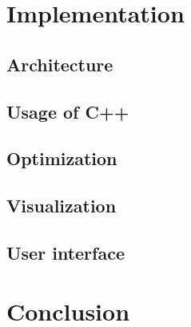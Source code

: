 \chapter{Implementation}

\section{Architecture}

\section{Usage of C++}

\section{Optimization}

\section{Visualization}

\section{User interface}

\chapter{Conclusion}
